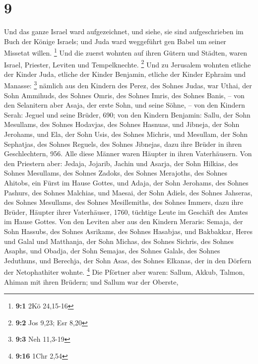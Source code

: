 \hypertarget{section-8}{%
\section{9}\label{section-8}}

 Und das ganze Israel ward aufgezeichnet, und siehe, sie
sind aufgeschrieben im Buch der Könige Israels; und Juda ward weggeführt
gen Babel um seiner Missetat willen. \footnote{\textbf{9:1} 2Kö 24,15-16}
 Und die zuerst wohnten auf ihren Gütern und Städten,
waren Israel, Priester, Leviten und Tempelknechte. \footnote{\textbf{9:2}
  Jos 9,23; Esr 8,20}  Und zu Jerusalem wohnten etliche
der Kinder Juda, etliche der Kinder Benjamin, etliche der Kinder Ephraim
und Manasse: \footnote{\textbf{9:3} Neh 11,3-19}  nämlich
aus den Kindern des Perez, des Sohnes Judas, war Uthai, der Sohn
Ammihuds, des Sohnes Omris, des Sohnes Imris, des Sohnes Banis, --
 von den Selanitern aber Asaja, der erste Sohn, und seine
Söhne, --  von den Kindern Serah: Jeguel und seine Brüder,
690;  von den Kindern Benjamin: Sallu, der Sohn Mesullams,
des Sohnes Hodavjas, des Sohnes Hasnuas,  und Jibneja, der
Sohn Jerohams, und Ela, der Sohn Usis, des Sohnes Michris, und Mesullam,
der Sohn Sephatjas, des Sohnes Reguels, des Sohnes Jibnejas,
 dazu ihre Brüder in ihren Geschlechtern, 956. Alle diese
Männer waren Häupter in ihren Vaterhäusern.  Von den
Priestern aber: Jedaja, Jojarib, Jachin  und Asarja, der
Sohn Hilkias, des Sohnes Mesullams, des Sohnes Zadoks, des Sohnes
Merajoths, des Sohnes Ahitobs, ein Fürst im Hause Gottes,
 und Adaja, der Sohn Jerohams, des Sohnes Pashurs, des
Sohnes Malchias, und Maesai, der Sohn Adiels, des Sohnes Jahseras, des
Sohnes Mesullams, des Sohnes Mesillemiths, des Sohnes Immers,
 dazu ihre Brüder, Häupter ihrer Vaterhäuser, 1760,
tüchtige Leute im Geschäft des Amtes im Hause Gottes. 
Von den Leviten aber aus den Kindern Meraris: Semaja, der Sohn Hassubs,
des Sohnes Asrikams, des Sohnes Hasabjas,  und Bakbakkar,
Heres und Galal und Matthanja, der Sohn Michas, des Sohnes Sichris, des
Sohnes Asaphs,  und Obadja, der Sohn Semajas, des Sohnes
Galals, des Sohnes Jeduthuns, und Berechja, der Sohn Asas, des Sohnes
Elkanas, der in den Dörfern der Netophathiter wohnte. \footnote{\textbf{9:16}
  1Chr 2,54}  Die Pförtner aber waren: Sallum, Akkub,
Talmon, Ahiman mit ihren Brüdern; und Sallum war der Oberste,
